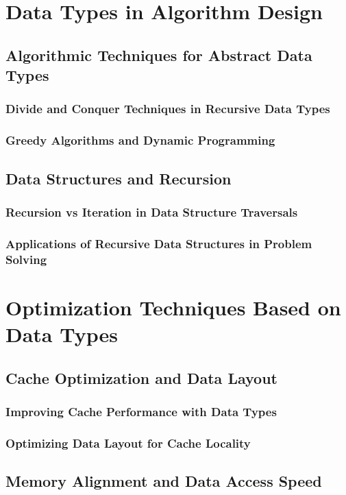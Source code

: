 \documentclass[12pt, oneside]{book}
\begin{document}
\section{Data Types in Algorithm Design}
\subsection{Algorithmic Techniques for Abstract Data Types}
\subsubsection{Divide and Conquer Techniques in Recursive Data Types}
\subsubsection{Greedy Algorithms and Dynamic Programming}
\subsection{Data Structures and Recursion}
\subsubsection{Recursion vs Iteration in Data Structure Traversals}
\subsubsection{Applications of Recursive Data Structures in Problem Solving}
\section{Optimization Techniques Based on Data Types}
\subsection{Cache Optimization and Data Layout}
\subsubsection{Improving Cache Performance with Data Types}
\subsubsection{Optimizing Data Layout for Cache Locality}
\subsection{Memory Alignment and Data Access Speed}
\end{document}
